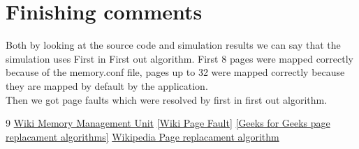 \section{Finishing comments}
Both by looking at the source code and simulation results we can say that the
simulation uses First in First out algorithm. First 8 pages were mapped
correctly because of the memory.conf file, pages up to 32 were mapped correctly
because they are mapped by default by the application. \\
Then we got page faults which were resolved by first in first out algorithm. 
\begin{thebibliography}{9}
	 \href{https://en.wikipedia.org/wiki/Memory_management_unit}{Wiki Memory Management Unit}
	 \href{https://en.wikipedia.org/wiki/Page_fault}{[Wiki Page Fault]}
\href{https://www.geeksforgeeks.org/page-replacement-algorithms-in-operating-systems/}{[Geeks
for Geeks page replacament algorithms]}
\href{https://en.wikipedia.org/wiki/Page_replacement_algorithm}{Wikipedia Page
replacament algorithm}
\end{thebibliography}
